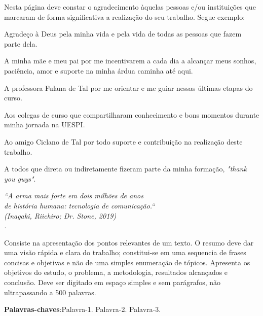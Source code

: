\documentclass[
	12pt,				%
	openright,			%
	oneside,			%
	a4paper,			%
	chapter=TITLE,		%
	english,			%
	brazil,				%
	]{abntex2}
\renewcommand{\ABNTEXchapterfont}{\normalfont}
\begin{document}
\begin{agradecimentos}
\ABNTEXchapterfont
Nesta página deve constar o agradecimento àquelas pessoas e/ou instituições que marcaram de forma significativa a realização do seu trabalho. Segue exemplo:

Agradeço à Deus pela minha vida e pela vida de todas as pessoas que fazem parte dela.

A minha mãe e meu pai por me incentivarem a cada dia a alcançar meus sonhos, paciência, amor e suporte na minha árdua caminha até aqui.

A professora Fulana de Tal por me orientar e me guiar nessas últimas etapas do curso.

Aos colegas de curso que compartilharam conhecimento e bons momentos durante minha jornada na UESPI.

Ao amigo Ciclano de Tal por todo suporte e contribuição na realização deste trabalho.

A todos que direta ou indiretamente fizeram parte da minha formação, \textit{"thank you guys"}.

\end{agradecimentos}

\begin{epigrafe}
    \vspace*{\fill}
	\begin{flushright}
		\textit{``A arma mais forte em dois milhões de anos\\
		de história humana: tecnologia de comunicação.`` \\
		(Inagaki, Riichiro; Dr. Stone, 2019)\\.}
	\end{flushright}
\end{epigrafe}


\setlength{\absparsep}{18pt} %
\begin{resumo}
\ABNTEXchapterfont
Consiste na apresentação dos pontos relevantes de um texto. O resumo deve dar uma visão rápida e clara do trabalho; constitui-se em uma sequencia de frases concisas e objetivas e não de uma simples enumeração de tópicos. Apresenta os objetivos do estudo, o problema, a metodologia, resultados alcançados e conclusão. Deve ser digitado em espaço simples e sem parágrafos, não ultrapassando a 500 palavras.


\textbf{Palavras-chaves}:Palavra-1. Palavra-2. Palavra-3.
\end{resumo}
\end{document}
